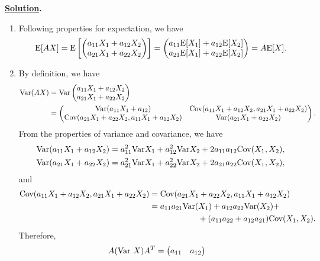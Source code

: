 \textbf{\underline{Solution}.}
\begin{enumerate}
	\item Following properties for expectation, we have
	\begin{align*}
	\mathrm{E}[AX] = \mathrm{E}\left[
	\begin{pmatrix}
	a_{11}X_1 + a_{12}X_2 \\ a_{21}X_1 + a_{22}X_2
	\end{pmatrix}
	\right] = \begin{pmatrix}
	a_{11}\mathrm{E}[X_1] + a_{12}\mathrm{E}[X_2] \\
	a_{21}\mathrm{E}[X_1] + a_{22}\mathrm{E}[X_2]
	\end{pmatrix} = A\mathrm{E}[X].
	\end{align*}
	\item By definition, we have
	\begin{align*}
	\mathrm{Var}(AX) & = \mathrm{Var}\begin{pmatrix}
	a_{11}X_1 + a_{12}X_2 \\
	a_{21}X_1 + a_{22}X_2
	\end{pmatrix} \\
	& = \begin{pmatrix}
	\mathrm{Var}(a_{11}X_1 + a_{12}) & \mathrm{Cov}(a_{11}X_1 + a_{12}X_2, a_{21}X_1 + a_{22}X_2) \\
	\mathrm{Cov}(a_{21}X_1 + a_{22}X_2, a_{11}X_1 + a_{12}X_2) & \mathrm{Var}(a_{21}X_1 + a_{22}X_2)
	\end{pmatrix}.
	\end{align*}
	From the properties of variance and covariance, we have
	\begin{align*}
	\mathrm{Var}(a_{11}X_1 + a_{12}X_2) & = a_{11}^2\mathrm{Var}X_1 + a_{12}^2\mathrm{Var}X_2 + 2a_{11}a_{12}\mathrm{Cov}(X_1, X_2), \\
	\mathrm{Var}(a_{21}X_1 + a_{22}X_2) & = a_{21}^2\mathrm{Var}X_1 + a_{22}^2\mathrm{Var}X_2 + 2a_{21}a_{22}\mathrm{Cov}(X_1, X_2),
	\end{align*}
	and
	\begin{align*}
	\mathrm{Cov}(a_{11}X_1 + a_{12}X_2, a_{21}X_1 + a_{22}X_2) & = \mathrm{Cov}(a_{21}X_1 + a_{22}X_2, a_{11}X_1 + a_{12}X_2) \\
	& = a_{11}a_{21}\mathrm{Var}(X_1) + a_{12}a_{22}\mathrm{Var}(X_2) + \\
	& \qquad\qquad\qquad + (a_{11}a_{22} + a_{12}a_{21})\mathrm{Cov}(X_1, X_2).
	\end{align*}
	Therefore,
	\begin{align*}
	A(\mathrm{Var}\ X)A^T & = \begin{pmatrix}
	a_{11} & a_{12} \\

\end{pmatrix}
\end{align*}
\end{enumerate}
